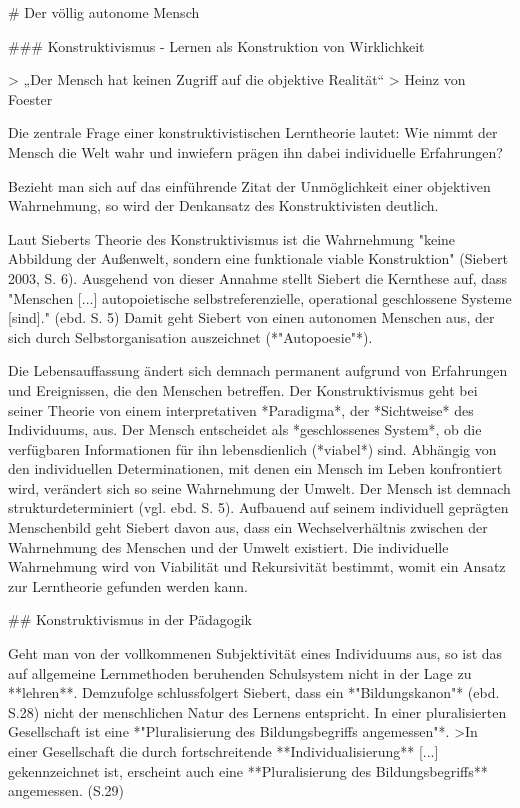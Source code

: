 # Der völlig autonome Mensch

### Konstruktivismus - Lernen als Konstruktion von Wirklichkeit

> „Der Mensch hat keinen Zugriff auf die objektive Realität“
> Heinz von Foester

Die zentrale Frage einer konstruktivistischen Lerntheorie lautet:
Wie nimmt der Mensch die Welt wahr und inwiefern prägen ihn dabei individuelle Erfahrungen?

Bezieht man sich auf das einführende Zitat der Unmöglichkeit einer objektiven Wahrnehmung, so wird der Denkansatz des Konstruktivisten deutlich.

Laut Sieberts Theorie des Konstruktivismus ist die Wahrnehmung "keine Abbildung der Außenwelt, sondern eine funktionale viable Konstruktion" (Siebert 2003, S. 6).
Ausgehend von dieser Annahme stellt Siebert die Kernthese auf, dass "Menschen [...] autopoietische selbstreferenzielle, operational geschlossene Systeme [sind]." (ebd. S. 5)
Damit geht Siebert von einen autonomen Menschen aus, der sich durch Selbstorganisation auszeichnet (*"Autopoesie"*).

Die Lebensauffassung ändert sich demnach permanent aufgrund von Erfahrungen und Ereignissen, die den Menschen betreffen.
Der Konstruktivismus geht bei seiner Theorie von einem interpretativen *Paradigma*, der *Sichtweise* des Individuums, aus.
Der Mensch entscheidet als *geschlossenes System*, ob die verfügbaren Informationen für ihn lebensdienlich (*viabel*) sind.
Abhängig von den individuellen Determinationen, mit denen ein Mensch im Leben konfrontiert wird, verändert sich so seine Wahrnehmung der Umwelt.
Der Mensch ist demnach strukturdeterminiert (vgl. ebd. S. 5).
Aufbauend auf seinem individuell geprägten Menschenbild geht Siebert davon aus, dass ein Wechselverhältnis zwischen der Wahrnehmung des Menschen und der Umwelt existiert.
Die individuelle Wahrnehmung wird von Viabilität und Rekursivität bestimmt, womit ein Ansatz zur Lerntheorie gefunden werden kann.


## Konstruktivismus in der Pädagogik

Geht man von der vollkommenen Subjektivität eines Individuums aus, so ist das auf allgemeine Lernmethoden beruhenden Schulsystem nicht in der Lage zu **lehren**.
Demzufolge schlussfolgert Siebert, dass ein *"Bildungskanon"* (ebd. S.28) nicht der menschlichen Natur des Lernens entspricht.
In einer pluralisierten Gesellschaft ist eine *"Pluralisierung des Bildungsbegriffs angemessen"*.
>In einer Gesellschaft die durch fortschreitende **Individualisierung** [...] gekennzeichnet ist, erscheint auch eine **Pluralisierung des Bildungsbegriffs** angemessen. (S.29)

